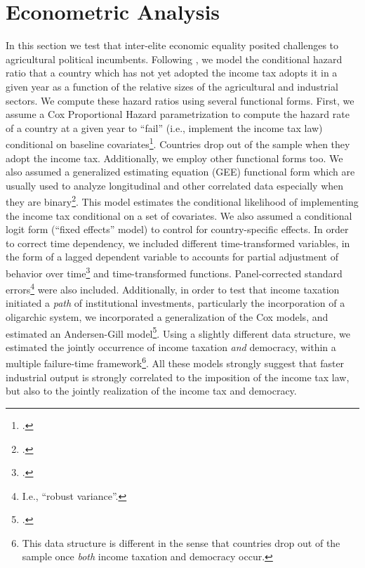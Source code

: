 \documentclass[onesided]{article}\usepackage[]{graphicx}\usepackage[]{color}
\begin{document}
\section{Econometric Analysis\label{methods}}

In this section we test that inter-elite economic equality posited challenges to agricultural political incumbents. Following \citet{Aidt2009a}, we model the conditional hazard ratio that a country which has not yet adopted the income tax adopts it in a given year as a function of the relative sizes of the agricultural and industrial sectors. We compute these hazard ratios using several functional forms. First, we assume a Cox Proportional Hazard parametrization to compute the hazard rate of a country at a given year to ``fail'' (i.e., implement the income tax law) conditional on baseline covariates\footnote{\citet{Box-Steffensmeier2004}.}. Countries drop out of the sample when they adopt the income tax. Additionally, we employ other functional forms too. We also assumed a generalized estimating equation (GEE) functional form  which are usually used to analyze longitudinal and other correlated data especially when they are binary\footnote{\citet{Hanley2003}.}. This model estimates the conditional likelihood of implementing the income tax conditional on a set of covariates. We also assumed a conditional logit form (``fixed effects'' model) to control for country-specific effects. In order to correct time dependency, we included different time-transformed variables, in the form of a lagged dependent variable to accounts for partial adjustment of behavior over time\footnote{\citet{Wawro2002}.} and time-transformed functions. Panel-corrected standard errors\footnote{I.e., ``robust variance''.} were also included. Additionally, in order to test that income taxation initiated a \emph{path} of institutional investments, particularly the incorporation of a oligarchic  system, we incorporated a generalization of the Cox models, and estimated an Andersen-Gill model\footnote{\citet[185-]{Therneau2000}.}. Using a slightly different data structure, we estimated the jointly occurrence of income taxation \emph{and} democracy, within a multiple failure-time framework\footnote{This data structure is different in the sense that countries drop out of the sample once \emph{both} income taxation and democracy occur.}. All these models strongly suggest that faster industrial output is strongly correlated to the imposition of the income tax law, but also to the jointly realization of the income tax and democracy.
\end{document}
